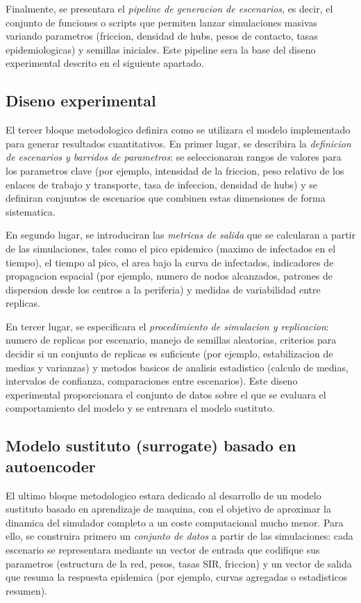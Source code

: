 Finalmente, se presentara el \emph{pipeline de generacion de escenarios}, es decir, el conjunto de funciones o scripts que permiten lanzar simulaciones masivas variando parametros (friccion, densidad de hubs, pesos de contacto, tasas epidemiologicas) y semillas iniciales. 
Este pipeline sera la base del diseno experimental descrito en el siguiente apartado.

\subsection{Diseno experimental}

El tercer bloque metodologico definira como se utilizara el modelo implementado para generar resultados cuantitativos. 
En primer lugar, se describira la \emph{definicion de escenarios y barridos de parametros}: se seleccionaran rangos de valores para los parametros clave (por ejemplo, intensidad de la friccion, peso relativo de los enlaces de trabajo y transporte, tasa de infeccion, densidad de hubs) y se definiran conjuntos de escenarios que combinen estas dimensiones de forma sistematica.

En segundo lugar, se introduciran las \emph{metricas de salida} que se calcularan a partir de las simulaciones, tales como el pico epidemico (maximo de infectados en el tiempo), el tiempo al pico, el area bajo la curva de infectados, indicadores de propagacion espacial (por ejemplo, numero de nodos alcanzados, patrones de dispersion desde los centros a la periferia) y medidas de variabilidad entre replicas.

En tercer lugar, se especificara el \emph{procedimiento de simulacion y replicacion}: numero de replicas por escenario, manejo de semillas aleatorias, criterios para decidir si un conjunto de replicas es suficiente (por ejemplo, estabilizacion de medias y varianzas) y metodos basicos de analisis estadistico (calculo de medias, intervalos de confianza, comparaciones entre escenarios). 
Este diseno experimental proporcionara el conjunto de datos sobre el que se evaluara el comportamiento del modelo y se entrenara el modelo sustituto.

\subsection{Modelo sustituto (surrogate) basado en autoencoder}

El ultimo bloque metodologico estara dedicado al desarrollo de un modelo sustituto basado en aprendizaje de maquina, con el objetivo de aproximar la dinamica del simulador completo a un coste computacional mucho menor. 
Para ello, se construira primero un \emph{conjunto de datos} a partir de las simulaciones: cada escenario se representara mediante un vector de entrada que codifique sus parametros (estructura de la red, pesos, tasas SIR, friccion) y un vector de salida que resuma la respuesta epidemica (por ejemplo, curvas agregadas o estadisticos resumen).

